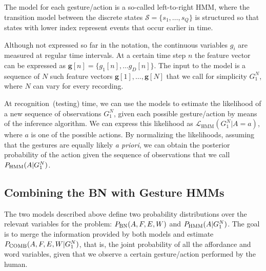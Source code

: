The model for each gesture/action is a so-called left-to-right \ac{HMM}, where the transition model between the discrete states $\mathcal{S} = \{s_1, \dots, s_Q\}$ is structured so that states with lower index represent events that occur earlier in time.

Although not expressed so far in the notation, the continuous variables $g_i$ are measured at regular time intervals.
At a certain time step $n$ the feature vector can be expressed as $\mathbf{g}[n] = \{g_1[n], \dots g_D[n]\}$.
The input to the model is a sequence of $N$ such feature vectors $\mathbf{g}[1], \dots, \mathbf{g}[N]$ that we call for simplicity $G_1^N$, where $N$ can vary for every recording.

At recognition~(testing) time, we can use the models to estimate the likelihood of a new sequence of observations $G_1^N$, given each possible gesture/action by means of the \FB{} inference algorithm.
We can express this likelihood as $\mathcal{L}_\text{HMM}(G_1^N|A=a)$, where $a$ is one of the possible actions.
By normalizing the likelihoods, assuming that the gestures are equally likely \emph{a priori}, we can obtain the posterior probability of the action given the sequence of observations that we call $P_{\text{HMM}}(A|G_1^N)$.


\newcommand{\pcomb}{\ensuremath P_\text{COMB}}
\newcommand{\xinf}{\ensuremath X_\text{INF}}
\newcommand{\xobs}{\ensuremath X_\text{OBS}}
\newcommand{\xlat}{\ensuremath X_\text{LAT}}

\subsection{Combining the \acs{BN} with Gesture \acsp{HMM}}
\label{sec:combination}
The two models described above define two probability distributions over the relevant variables for the problem:
$P_{\text{BN}}(A, F, E, W)$ and $P_{\text{HMM}}(A|G_1^N)$.
The goal is to merge the information provided by both models and estimate $\pcomb(A, F, E, W|G_1^N)$, that is, the joint probability of all the affordance and word variables, given that we observe a certain gesture/action performed by the human.

